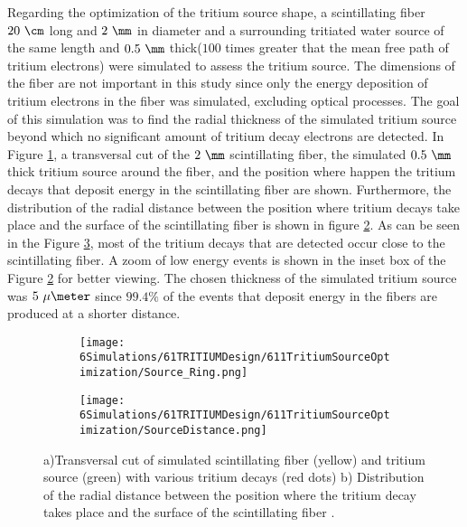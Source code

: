 Regarding the optimization of the tritium source shape, a scintillating fiber $20~\cm$ long and $2~\mm$ in diameter and a surrounding tritiated water source of the same length and $0.5~\mm$ thick($100$ times greater that the mean free path of tritium electrons) were simulated to assess the tritium source. The dimensions of the fiber are not important in this study since only the energy deposition of tritium electrons in the fiber was simulated, excluding optical processes. The goal of this simulation was to find the radial thickness of the simulated tritium source beyond which no significant amount of tritium decay electrons are detected. In Figure \ref{subfig:TransversalCutTritiumSource}, a transversal cut of the $2~\mm$ scintillating fiber, the simulated $0.5~\mm$ thick tritium source around the fiber, and the position where happen the tritium decays that deposit energy in the scintillating fiber are shown. Furthermore, the distribution of the radial distance between the position where tritium decays take place and the surface of the scintillating fiber is shown in figure \ref{subfig:DistanceDistributionTritiumSourceFiber}. As can be seen in the Figure \ref{fig:TritiumSourceSimulated}, most of the tritium decays that are detected occur close to the scintillating fiber.  A zoom of low energy events is shown in the inset box of the Figure \ref{subfig:DistanceDistributionTritiumSourceFiber} for better viewing. The chosen thickness of the simulated tritium source was $5~\mu\meter$ since $99.4\%$ of the events that deposit energy in the fibers are produced at a shorter distance.

\begin{figure}
\centering
    \begin{subfigure}[b]{0.45\textwidth}
    \centering
    \texttt{[image: 6Simulations/61TRITIUMDesign/611TritiumSourceOptimization/Source\_Ring.png]}  
    \caption{\label{subfig:TransversalCutTritiumSource}}
    \end{subfigure}
    \hfill
    \begin{subfigure}[b]{0.45\textwidth}
    \centering
    \texttt{[image: 6Simulations/61TRITIUMDesign/611TritiumSourceOptimization/SourceDistance.png]}  
    \caption{\label{subfig:DistanceDistributionTritiumSourceFiber}}
    \end{subfigure}
 \caption{a)Transversal cut of simulated scintillating fiber (yellow) and tritium source (green) with various tritium decays (red dots) b) Distribution of the radial distance between the position where the tritium decay takes place and the surface of the scintillating fiber \cite{SimulationPaperCarlos}.}
 \label{fig:TritiumSourceSimulated}
\end{figure}	


